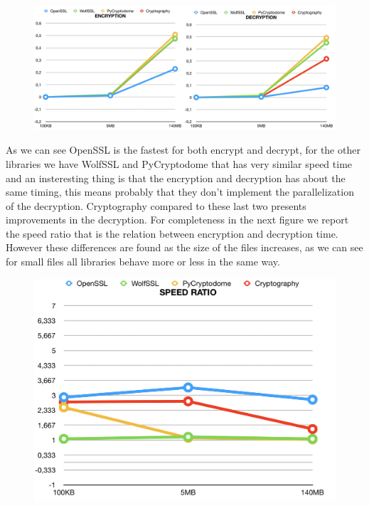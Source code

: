 \documentclass[11pt]{article}
\begin{document}
\begin{figure}[!ht]
  \includegraphics[width=1\textwidth]{pic2-hw4-1635747}
  \label{fig:Encryption and Decryption speed}
\end{figure}

As we can see OpenSSL is the fastest for both encrypt and decrypt, for the other libraries we have WolfSSL and PyCryptodome that has very similar speed time and an insteresting thing is that the encryption and decryption has about the same timing, this means probably that they don't implement the parallelization of the decryption. Cryptography compared to these last two presents improvements in the decryption. For completeness in the next figure we report the speed ratio that is the relation between encryption and decryption time. However these differences are found as the size of the files increases, as we can see for small files all libraries behave more or less in the same way.

\begin{figure}[!ht]
  \includegraphics[width=1\textwidth]{pic3-hw4-1635747}
  \label{fig:Speed ratio}
\end{figure}
\end{document}
